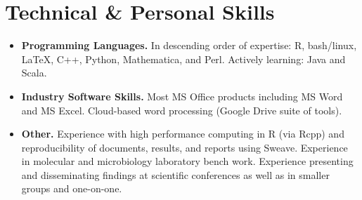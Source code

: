 \documentclass[11pt,letterpaper,sans]{moderncv}        %
\begin{document}
\section{Technical \& Personal Skills}

\vspace{4pt}

\begin{itemize}

\item \textbf{Programming Languages.} In descending order of expertise: R, bash/linux, \LaTeX, C++, Python, Mathematica, and Perl. Actively learning: Java and Scala.

\vspace{4pt}

\item \textbf{Industry Software Skills.} Most MS Office products including MS Word and MS Excel. Cloud-based word processing (Google Drive suite of tools).

\vspace{4pt}

\item \textbf{Other.} Experience with high performance computing in R (via Rcpp) and reproducibility of documents, results, and reports using Sweave.  Experience in molecular and microbiology laboratory bench work. Experience presenting and disseminating findings at scientific conferences as well as in smaller groups and one-on-one.

\end{itemize}
\vspace{4pt}
%
%
\end{document}
